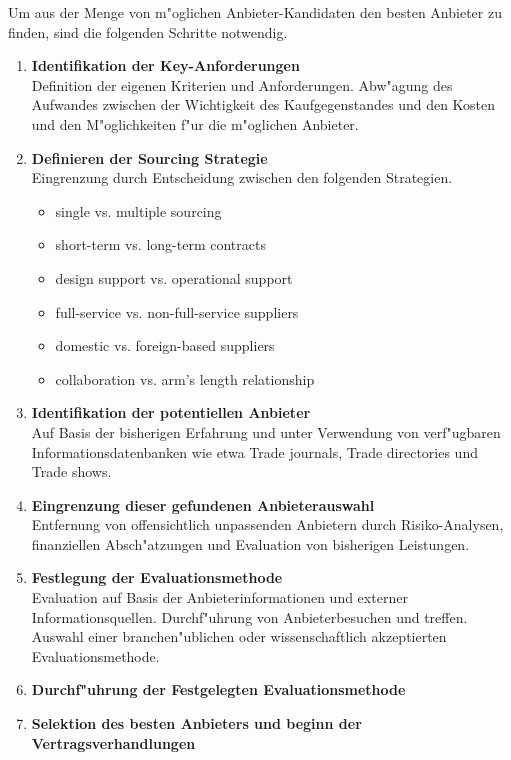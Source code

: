 Um aus der Menge von m"oglichen Anbieter-Kandidaten den besten Anbieter zu finden, sind die folgenden Schritte notwendig. \cite{Wan2013}

\begin{enumerate}

	\item \textbf{Identifikation der Key-Anforderungen}\\
Definition der eigenen Kriterien und Anforderungen. Abw"agung des Aufwandes zwischen der Wichtigkeit des Kaufgegenstandes und den Kosten und den M"oglichkeiten f"ur die m"oglichen Anbieter.
	
	\item \textbf{Definieren der Sourcing Strategie}\\
Eingrenzung durch Entscheidung zwischen den folgenden Strategien.

	\begin{itemize}
	
		\item single vs. multiple sourcing
		\item short-term vs. long-term contracts
		\item design support vs. operational support
		\item full-service vs. non-full-service suppliers
		\item domestic vs. foreign-based suppliers
		\item collaboration vs. arm's length relationship	
		
	\end{itemize}
	
	\item \textbf{Identifikation der potentiellen Anbieter}\\
Auf Basis der bisherigen Erfahrung und unter Verwendung von verf"ugbaren Informationsdatenbanken wie etwa Trade journals, Trade directories und Trade shows.
	
	\item \textbf{Eingrenzung dieser gefundenen Anbieterauswahl}\\
Entfernung von offensichtlich unpassenden Anbietern durch Risiko-Analysen, finanziellen Absch"atzungen und Evaluation von bisherigen Leistungen. 

	\item \textbf{Festlegung der Evaluationsmethode}\\
Evaluation auf Basis der Anbieterinformationen und externer Informationsquellen. Durchf"uhrung von Anbieterbesuchen und treffen. Auswahl einer branchen"ublichen oder wissenschaftlich akzeptierten Evaluationsmethode.
	
	\item \textbf{Durchf"uhrung der Festgelegten Evaluationsmethode}
	
	\item \textbf{Selektion des besten Anbieters und beginn der Vertragsverhandlungen}

\end{enumerate}